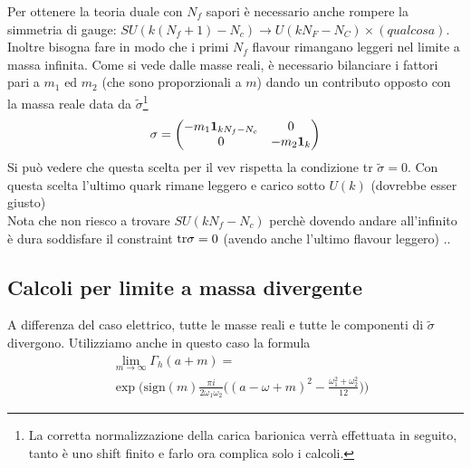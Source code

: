 \documentclass[a4paper,12pt]{article}
\begin{document}
Per ottenere la teoria duale con $N_f$ sapori è necessario anche rompere la simmetria di gauge: $SU(k(N_f+1) -N_c) \rightarrow U( k N_F - N_C) \times (qualcosa)$. Inoltre bisogna fare in modo che i primi $N_f$ flavour rimangano leggeri nel limite a massa infinita. Come si vede dalle masse reali, è necessario bilanciare i fattori pari a $m_1$ ed $m_2$ (che sono proporzionali a $m$) dando un contributo opposto con la massa reale data da $\tilde{\sigma}$\footnote{La corretta normalizzazione della carica barionica verrà effettuata in seguito, tanto è uno shift finito e farlo ora complica solo i calcoli.}
\begin{equation}
 \sigma = 
 \begin{pmatrix}
  - m_1 \bold{ 1}_{ k N_f - N_c} & 0 \\
  0 &  - m_2 \bold{ 1}_{k}
 \end{pmatrix}
\end{equation}
Si può vedere che questa scelta per il vev rispetta la condizione tr $\tilde{\sigma} = 0$.
Con questa scelta l'ultimo quark rimane leggero e carico sotto $U(k)$ (dovrebbe esser giusto)\\
Nota che non riesco a trovare $SU( k N_f - N_c)$ perchè dovendo andare all'infinito è dura soddisfare il constraint $ \hbox{tr} \sigma = 0$ (avendo anche l'ultimo flavour leggero) ..
\subsection{Calcoli per limite a massa divergente}
A differenza del caso elettrico, tutte le masse reali e tutte le componenti di $\tilde{\sigma}$ divergono.
Utilizziamo anche in questo caso la formula 
\begin{align}
&\lim_{ m \rightarrow \infty } \Gamma_h ( a +  m) = \\
& \exp \bigg( \mbox{sign} (m) \frac{\pi i }{2 \omega_1 \omega_2} \bigg( ( a - \omega + m)^2 - \frac{\omega_1^2 + \omega_2^2}{12} \bigg) \bigg)
\label{eqn:gamma_lim_m}
\end{align}
\end{document}

